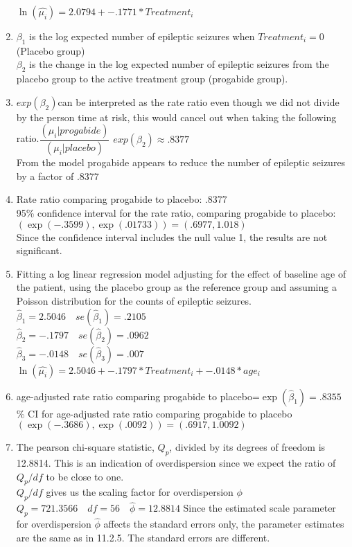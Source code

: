 \documentclass{article}
\newcommand{\B}{\beta}
\newcommand{\hb}{\hat{\beta}}
\begin{document}
\begin{flushleft}
\begin{enumerate}
$\ln(\hat{\mu_i})=2.0794+-.1771*Treatment_i$
\item
$\B_1$ is the log expected number of epileptic seizures when $Treatment_i=0$ (Placebo group)\\
$\B_2$ is the change in the log expected number of epileptic seizures from the placebo group to the active treatment group (progabide group).
\item 
 $exp(\B_2)$can be interpreted as the rate ratio even though we did not divide by the person time at risk, this would cancel out when taking the following ratio.\medbreak $\dfrac{(\mu_i|progabide)}{(\mu_i|placebo)}$ \medbreak
  $exp(\B_2)\approx .8377$\\
From the model progabide appears to reduce the number of epileptic seizures by a factor of .8377
\item
Rate ratio comparing progabide to placebo: .8377\\ 
95\% confidence interval for the rate ratio, comparing progabide to placebo:\\
$(\exp(-.3599),\exp(.01733))=(.6977,1.018)$\\
Since the confidence interval includes the null value 1, the results are not significant.
\item 
Fitting a log linear regression model adjusting for the effect of baseline age of the patient, using the placebo group as the reference group and assuming a Poisson distribution for the counts of epileptic seizures.\medbreak
$\hb_1=2.5046 \quad se(\hb_1)=.2105$\\
$\hb_2=-.1797 \quad se(\hb_2)=.0962$\\
$\hb_3=-.0148 \quad se(\hb_3)=.007$\medbreak
$\ln(\hat{\mu_i})=2.5046+-.1797*Treatment_i+-.0148*age_i$ \medbreak
\item
age-adjusted rate ratio comparing progabide to placebo=$\exp(\hb_1)=.8355$\% CI for age-adjusted rate ratio comparing progabide to placebo\\
$(\exp(-.3686),\exp(.0092))=(.6917,1.0092)$
\item
The pearson chi-square statistic, $Q_p$, divided by its degrees of freedom is 12.8814. This is an indication of overdispersion since we expect the ratio of $Q_p/df$ to be close to one.\\
 $Q_p/df$  gives us the scaling factor for overdispersion $\phi$\medbreak
$Q_p=721.3566 \quad df=56 \quad \hat{\phi}=12.8814$ 
Since the estimated scale parameter for overdispersion $\hat{\phi}$ affects the standard errors only, the parameter estimates are the same as in 11.2.5. The standard errors are different.\\

\end{enumerate}
\end{flushleft}
\end{document}
